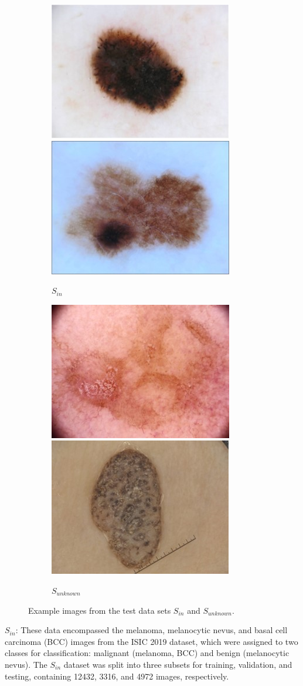 \begin{figure}[h]
	\centering
	\begin{subfigure}{\textwidth}
		\centering
		\includegraphics[width=0.3\linewidth]{images/MEL.jpg}
		\includegraphics[width=0.3\linewidth]{images/NV.jpg}
		\caption{\(S_{in}\)}
	\end{subfigure}
	\begin{subfigure}{\textwidth}
		\centering
		\includegraphics[width=0.3\linewidth]{images/SCC.jpg}
		\includegraphics[width=0.3\linewidth]{images/BLK.jpg}
		\caption{\(S_{unknown}\)}
	\end{subfigure}
	\caption{Example images from the test data sets \(S_{in}\) and \(S_{unknown}\).}
	\label{fig:isic_dataset_examples}
\end{figure}

$S_{in}$: These data encompassed the melanoma, melanocytic nevus, and basal cell carcinoma (BCC) images from the ISIC 2019 dataset, which were assigned to two classes for classification: malignant (melanoma, BCC) and benign (melanocytic nevus). The $S_{in}$ dataset was split into three subsets for training, validation, and testing, containing 12432, 3316, and 4972 images, respectively.

